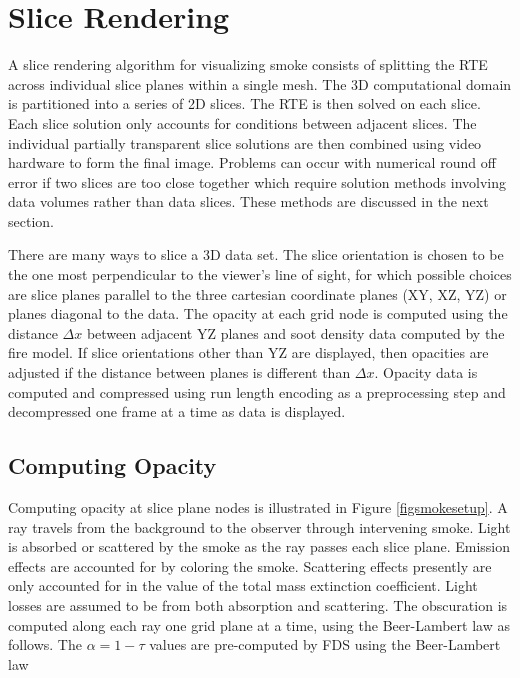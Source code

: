 {\section{Slice Rendering}
A slice rendering algorithm for visualizing smoke consists of splitting the RTE across individual slice planes within a single mesh.  The 3D computational domain is partitioned into a series of 2D slices.  The RTE is then solved on each slice.  Each slice solution only accounts for conditions between adjacent slices.  The individual partially transparent slice solutions are then combined using video hardware to form the final image.   Problems can occur with numerical round off error if two slices are too close together which require solution methods  involving data volumes rather than data slices. These methods are discussed in the next section.

There are many ways to slice a 3D data set.  The slice orientation is chosen to be the one most perpendicular to the viewer's line of sight, for which possible choices are slice planes parallel to the three cartesian coordinate planes (XY, XZ, YZ) or planes diagonal to the data.  The opacity at each grid node is computed using the distance $\Delta x$ between adjacent YZ planes and soot density data computed by the fire model.  If slice orientations other than YZ are displayed, then opacities are adjusted if the distance between planes is different than $\Delta x$.  Opacity data is computed and compressed using run length encoding as a preprocessing step and decompressed one frame at a time as data is displayed.


\subsection{Computing Opacity}
Computing opacity at slice plane nodes is illustrated in Figure
\ref{figsmokesetup}. A ray travels from the background to the
observer through intervening smoke. Light is absorbed or scattered
by the smoke as the ray passes each slice plane. Emission effects
are accounted for by coloring the smoke.  Scattering effects
presently are only accounted for in the value of the total mass
extinction coefficient.  Light losses are assumed to be from both
absorption and scattering. The obscuration is computed along each
ray one grid plane at a time, using the Beer-Lambert law as
follows.  The $\alpha=1-\tau$ values are pre-computed by FDS using
the Beer-Lambert law~\cite{Siegel:2001}

}
